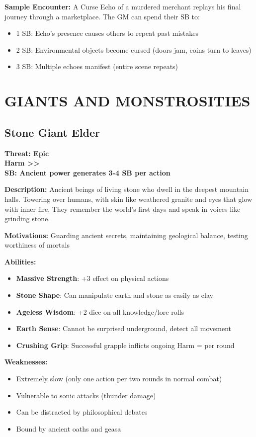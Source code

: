 \documentclass[12pt]{article}
\newcommand{\cp}[1]{\textbf{SB: #1}}
\newcommand{\harm}[1]{\textbf{Harm #1}}
\newcommand{\threat}[1]{\textbf{Threat: #1}}
\begin{document}
\textbf{Sample Encounter:}
A Curse Echo of a murdered merchant replays his final journey through a marketplace. The GM can spend their SB to:
\begin{itemize}
\item 1 SB: Echo's presence causes others to repeat past mistakes
\item 2 SB: Environmental objects become cursed (doors jam, coins turn to leaves)
\item 3 SB: Multiple echoes manifest (entire scene repeats)
\end{itemize}

\section{GIANTS AND MONSTROSITIES}

\subsection*{Stone Giant Elder}

\threat{Epic} \\
\harm{>>} \\
\cp{Ancient power generates 3-4 SB per action}

\vspace{0.5em}
\textbf{Description:} Ancient beings of living stone who dwell in the deepest mountain halls. Towering over humans, with skin like weathered granite and eyes that glow with inner fire. They remember the world's first days and speak in voices like grinding stone.

\textbf{Motivations:} Guarding ancient secrets, maintaining geological balance, testing worthiness of mortals

\textbf{Abilities:}
\begin{itemize}
\item \textbf{Massive Strength}: +3 effect on physical actions
\item \textbf{Stone Shape}: Can manipulate earth and stone as easily as clay
\item \textbf{Ageless Wisdom}: +2 dice on all knowledge/lore rolls
\item \textbf{Earth Sense}: Cannot be surprised underground, detect all movement
\item \textbf{Crushing Grip}: Successful grapple inflicts ongoing Harm = per round
\end{itemize}

\textbf{Weaknesses:}
\begin{itemize}
\item Extremely slow (only one action per two rounds in normal combat)
\item Vulnerable to sonic attacks (thunder damage)
\item Can be distracted by philosophical debates
\item Bound by ancient oaths and geasa
\end{itemize}
\end{document}
